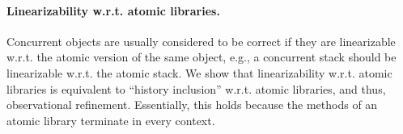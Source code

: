 
\paragraph{Linearizability w.r.t. atomic libraries.}
Concurrent objects are usually considered to be
correct if they are linearizable w.r.t. the atomic version of the same object, 
e.g., a concurrent stack should be linearizable w.r.t. the
atomic stack. 
%
%
%
%
%
%
%
%
%
We show that linearizability w.r.t. atomic libraries is equivalent to ``history inclusion'' w.r.t. atomic libraries,
and thus, observational refinement. Essentially, this holds because the methods
of an atomic library terminate in every context.

